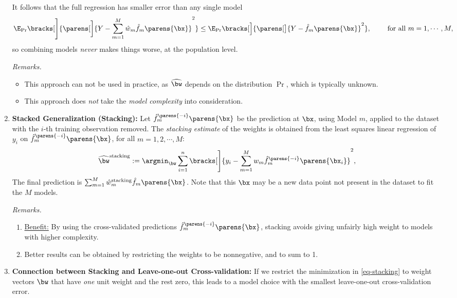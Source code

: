 \documentclass[12pt]{article}
\begin{document}
\begin{enumerate}[label=\textbf{\arabic*.}]
	It follows that the full regression has smaller error than any single model
	\begin{align*}
		\E_{\Pr} \bracks[\Bigg]{ \parens[\bigg]{Y - \sum_{m=1}^M \hat{w}_m \hat{f}_{m} \parens{\bx}}^2} \le \E_{\Pr} \bracks[\Big]{ \parens[\big]{Y - \hat{f}_{m} \parens{\bx}}^2}, \qquad \text{ for all } m = 1, \cdots, M, 
	\end{align*}
	so combining models \emph{never} makes things worse, at the population level. 
	
	\textit{Remarks.} 
	\begin{itemize}
		\item This approach can not be used in practice, as $\widehat{\bw}$ depends on the distribution $\Pr$, which is typically unknown. 
		\item This approach does \emph{not} take the \textit{model complexity} into consideration. 
	\end{itemize}
	
	\item \textbf{Stacked Generalization (Stacking):} Let $\hat{f}_m^{\parens{-i}} \parens{\bx}$ be the prediction at $\bx$, using Model $m$, applied to the dataset with the $i$-th training observation removed. The \emph{stacking estimate} of the weights is obtained from the least squares linear regression of $y_i$ on $\hat{f}_m^{\parens{-i}} \parens{\bx}$, for all $m = 1, 2, \cdots, M$: 
	\begin{align}\label{eq-stacking}
		\widehat{\bw}^{\mathrm{stacking}} := \argmin_{\bw} \sum_{i=1}^n \bracks[\Bigg]{y_i - \sum_{m=1}^M w_m \hat{f}_m^{\parens{-i}} \parens{\bx_i}}^2, 
	\end{align}
	The final prediction is $\sum_{m=1}^M \hat{w}_m^{\mathrm{stacking}} \hat{f}_m \parens{\bx}$. Note that this $\bx$ may be a new data point not present in the dataset to fit the $M$ models. 
	
	\textit{Remarks.} 
	\begin{enumerate}
		\item \underline{Benefit:} By using the cross-validated predictions $\hat{f}_m^{\parens{-i}} \parens{\bx}$, stacking avoids giving unfairly high weight to models with higher complexity. 
		\item Better results can be obtained by restricting the weights to be nonnegative, and to sum to 1. 
	\end{enumerate}
	
	\item \textbf{Connection between Stacking and Leave-one-out Cross-validation:} If we restrict the minimization in \eqref{eq-stacking} to weight vectors $\bw$ that have \emph{one} unit weight and the rest zero, this leads to a model choice with the smallest leave-one-out cross-validation error. 
	

\end{enumerate}
\end{document}
